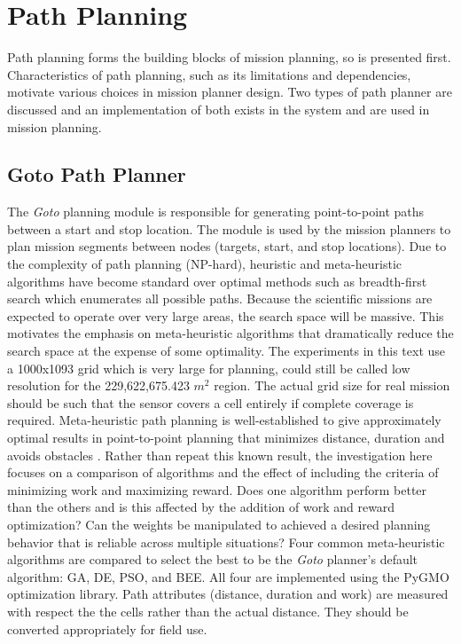 \documentclass{tamuccthesis}
\begin{document}
\section{Path Planning}

Path planning forms the building blocks of mission planning, so is presented first. Characteristics of path planning, such as its limitations and dependencies, motivate various choices in mission planner design. Two types of path planner are discussed and an implementation of both exists in the system and are used in mission planning.

\subsection{Goto Path Planner}
\label{section:goto}
The \textit{Goto} planning module is responsible for generating point-to-point paths between a start and stop location. The module is used by the mission planners to plan mission segments between nodes (targets, start, and stop locations). Due to the complexity of path planning (NP-hard), heuristic and meta-heuristic algorithms have become standard over optimal methods such as breadth-first search which enumerates all possible paths. Because the scientific missions are expected to operate over very large areas, the search space will be massive. This motivates the emphasis on meta-heuristic algorithms that dramatically reduce the search space at the expense of some optimality. The experiments in this text use a 1000x1093 grid which is very large for planning, could still be called low resolution for the 229,622,675.423 $m^2$ region. The actual grid size for real mission should be such that the sensor covers a cell entirely if complete coverage is required. Meta-heuristic path planning is well-established to give approximately optimal results in point-to-point planning that minimizes distance, duration and avoids obstacles \cite{hussein2012}. Rather than repeat this known result, the investigation here focuses on a comparison of algorithms and the effect of including the criteria of minimizing work and maximizing reward. Does one algorithm perform better than the others and is this affected by the addition of work and reward optimization? Can the weights be manipulated to achieved a desired planning behavior that is reliable across multiple situations? Four common meta-heuristic algorithms are compared to select the best to be the \textit{Goto} planner's default algorithm: GA, DE, PSO, and BEE. All four are implemented using the PyGMO optimization library. Path attributes (distance, duration and work) are measured with respect the the cells rather than the actual distance. They should be converted appropriately for field use.
\end{document}
